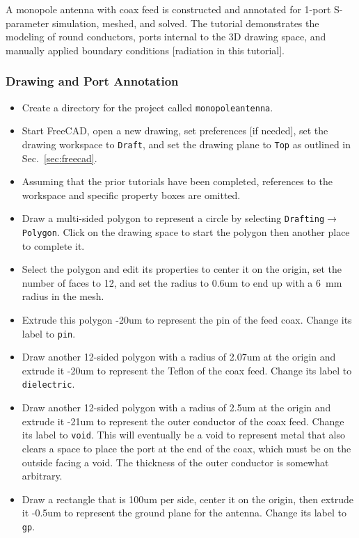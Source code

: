 \documentclass[titlepage]{article}
\renewcommand\_{\textunderscore\linebreak[1]}
\begin{document}
A monopole antenna with coax feed is constructed and annotated for 1-port S-parameter simulation, meshed, and solved.  The tutorial demonstrates the modeling of round conductors, ports internal to the 3D drawing space, and manually applied boundary conditions [radiation in this tutorial].

\subsubsection{Drawing and Port Annotation}

\begin{itemize}
\item Create a directory for the project called \texttt{monopole\_antenna}.
\item Start FreeCAD, open a new drawing, set preferences [if needed], set the drawing workspace to \texttt{Draft}, and set the drawing plane to \texttt{Top} as outlined in Sec.~\ref{sec:freecad}.
\item Assuming that the prior tutorials have been completed, references to the workspace and specific property boxes are omitted.
\item Draw a multi-sided polygon to represent a circle by selecting \texttt{Drafting}$\rightarrow$\texttt{Polygon}.  Click on the drawing space to start the polygon then another place to complete it.
\item Select the polygon and edit its properties to center it on the origin, set the number of faces to 12, and set the radius to 0.6um to end up with a 6~mm radius in the mesh.
\item Extrude this polygon -20um to represent the pin of the feed coax.  Change its label to \texttt{pin}.
\item Draw another 12-sided polygon with a radius of 2.07um at the origin and extrude it -20um to represent the Teflon of the coax feed.  Change its label to \texttt{dielectric}.
\item Draw another 12-sided polygon with a radius of 2.5um at the origin and extrude it -21um to represent the outer conductor of the coax feed.  Change its label to \texttt{void}. This will eventually be a void to represent metal that also clears a space to place the port at the end of the coax, which must be on the outside facing a void.  The thickness of the outer conductor is somewhat arbitrary.
\item Draw a rectangle that is 100um per side, center it on the origin, then extrude it -0.5um to represent the ground plane for the antenna. Change its label to \texttt{gp}.

\end{itemize}
\end{document}
